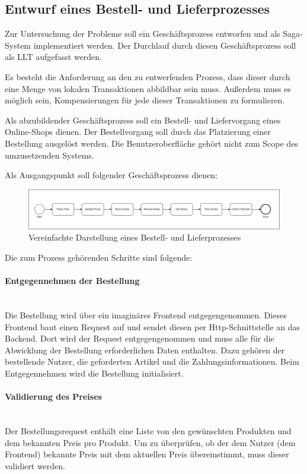 \subsection{Entwurf eines Bestell- und Lieferprozesses}

Zur Untersuchung der Probleme soll ein Geschäftsprozess entworfen und als Saga-System implementiert werden. Der Durchlauf durch diesen Geschäftsprozess soll als LLT aufgefasst werden. 

Es besteht die Anforderung an den zu entwerfenden Prozess, dass dieser durch eine Menge von lokalen Transaktionen abbildbar sein muss. Außerdem muss es möglich sein, Kompensierungen für jede dieser Transaktionen zu formulieren. 

Als abzubildender Geschäftsprozess soll ein Bestell- und Liefervorgang eines Online-Shops dienen. Der Bestellvorgang soll durch das Platzierung einer Bestellung ausgelöst werden. Die Benutzeroberfläche gehört nicht zum Scope des umzusetzenden Systems. 

Als Ausgangspunkt soll folgender Geschäftsprozess dienen:

\begin{figure}[h!]
	\includegraphics[width=\linewidth]{figures/SimplifiedBusinessProcess.png}
	\caption{Vereinfachte Darstellung eines Bestell- und Lieferprozesses}
\end{figure}

Die zum Prozess gehörenden Schritte sind folgende:

\paragraph*{Entgegennehmen der Bestellung} \mbox{}\\
Die Bestellung wird über ein imaginäres Frontend entgegengenommen. Dieses Frontend baut einen Request auf und sendet diesen per Http-Schnittstelle an das Backend. Dort wird der Request entgegengenommen und muss alle für die Abwicklung der Bestellung erforderlichen Daten enthalten. Dazu gehören der bestellende Nutzer, die geforderten Artikel und die Zahlungsinformationen. Beim Entgegennehmen wird die Bestellung initialisiert.

\paragraph*{Validierung des Preises} \mbox{}\\
Der Bestellungsrequest enthält eine Liste von den gewünschten Produkten und dem bekannten Preis pro Produkt. Um zu überprüfen, ob der dem Nutzer (dem Frontend) bekannte Preis mit dem aktuellen Preis übereinstimmt, muss dieser validiert werden. %


